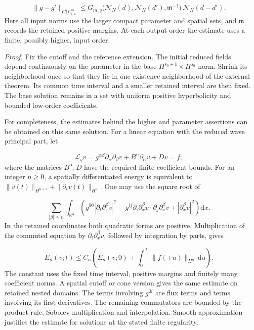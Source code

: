 \documentclass[
  english,
  11pt,
  reqno]{amsart}
\begin{document}
\label{eq:online-reduced-family-difference-bound} \[
\|g-g'\|_{C^q_\lambda C^m_{t,x}}
\le
G_{m,q}\bigl(\mathcal N_N(d),\mathcal N_N(d'),
\mathfrak m^{-1}\bigr)\,
\mathcal N_N(d-d').
\] Here all input norms use the larger compact parameter and spatial
sets, and \(\mathfrak m\) records the retained positive margins. At each
output order the estimate uses a finite, possibly higher, input order.

\emph{Proof.} Fix the cutoff and the reference extension. The initial
reduced fields depend continuously on the parameter in the base
\(H^{s_0+1}\times H^{s_0}\) norm. Shrink its neighborhood once so that
they lie in one existence neighborhood of the external theorem. Its
common time interval and a smaller retained interval are then fixed. The
base solution remains in a set with uniform positive hyperbolicity and
bounded low-order coefficients.

For completeness, the estimates behind the higher and parameter
assertions can be obtained on this same solution. For a linear equation
with the reduced wave principal part, let

\label{eq:online-linearized-reduced-wave} \[
\mathcal L_g v
=g^{\alpha\beta}\partial_\alpha\partial_\beta v
+B^\alpha\partial_\alpha v+Dv=f,
\] where the matrices \(B^\alpha,D\) have the required finite
coefficient bounds. For an integer \(n\ge0\), a spatially differentiated
energy is equivalent to \(\|v(t)\|_{H^{n+1}}+\|\partial_tv(t)\|_{H^n}\).
One may use the square root of

\label{eq:online-reduced-wave-energy} \[
\sum_{|\beta|\le n}\int_{\mathbb R^3}
\left(
g^{00}|\partial_t\partial_x^\beta v|^2
-g^{ij}\partial_i\partial_x^\beta v\cdot
          \partial_j\partial_x^\beta v
+|\partial_x^\beta v|^2
\right)\mathrm dx.
\] In the retained coordinates both quadratic forms are positive.
Multiplication of the commuted equation by
\(\partial_t\partial_x^\beta v\), followed by integration by parts,
gives

\label{eq:online-reduced-linear-energy-bound} \[
E_n(v;t)\le
C_n\left(
E_n(v;0)+\int_0^{|t|}
\|f(\pm u)\|_{H^n}\,\mathrm du
\right).
\] The constant uses the fixed time interval, positive margins and
finitely many coefficient norms. A spatial cutoff or cone version gives
the same estimate on retained nested domains. The terms involving
\(g^{0i}\) are flux terms and terms involving its first derivatives. The
remaining commutators are bounded by the product rule, Sobolev
multiplication and interpolation. Smooth approximation justifies the
estimate for solutions at the stated finite regularity.
\end{document}
